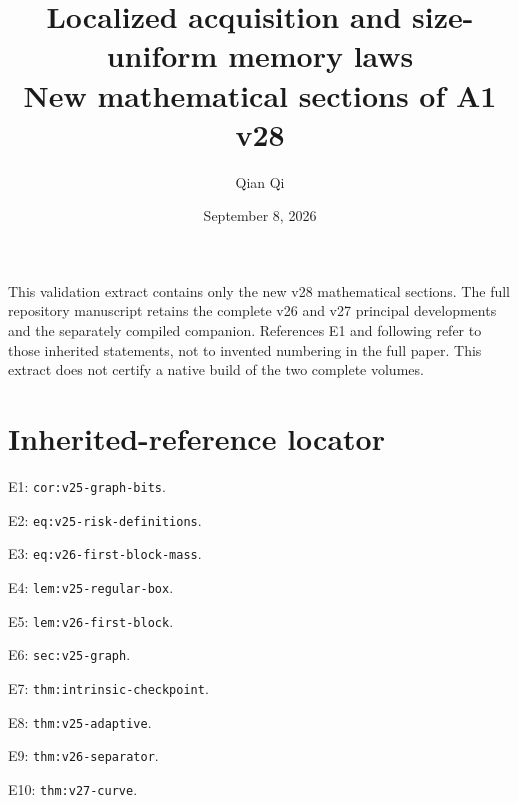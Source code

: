 

\title[Localized acquisition: revision extract]{Localized acquisition and size-uniform memory laws\\New mathematical sections of A1 v28}
\author{Qian Qi}
\date{September 8, 2026}

\maketitle
\noindent This validation extract contains only the new v28 mathematical
sections. The full repository manuscript retains the complete v26 and v27
principal developments and the separately compiled companion. References
E1 and following refer to those inherited statements, not to invented
numbering in the full paper. This extract does not certify a native
build of the two complete volumes.
\renewcommand{\thesubsection}{\arabic{subsection}}

\renewcommand{\thesubsection}{\thesection.\arabic{subsection}}



\section*{Inherited-reference locator}
\noindent\hypertarget{external.E1}{} E1: \texttt{cor:v25-graph-bits}.\par
\noindent\hypertarget{external.E2}{} E2: \texttt{eq:v25-risk-definitions}.\par
\noindent\hypertarget{external.E3}{} E3: \texttt{eq:v26-first-block-mass}.\par
\noindent\hypertarget{external.E4}{} E4: \texttt{lem:v25-regular-box}.\par
\noindent\hypertarget{external.E5}{} E5: \texttt{lem:v26-first-block}.\par
\noindent\hypertarget{external.E6}{} E6: \texttt{sec:v25-graph}.\par
\noindent\hypertarget{external.E7}{} E7: \texttt{thm:intrinsic-checkpoint}.\par
\noindent\hypertarget{external.E8}{} E8: \texttt{thm:v25-adaptive}.\par
\noindent\hypertarget{external.E9}{} E9: \texttt{thm:v26-separator}.\par
\noindent\hypertarget{external.E10}{} E10: \texttt{thm:v27-curve}.\par

